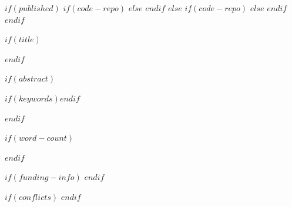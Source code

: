 

$if(published)$
$if(code-repo)$
$else$
$endif$
$else$
$if(code-repo)$
$else$
$endif$
$endif$

\vspace{0.25in}

$if(title)$
\maketitle
$endif$

\vspace{0.25in}


$if(abstract)$
\begin{abstract}
\noindent            %
$abstract$
\end{abstract}

\vspace{\baselineskip}

$if(keywords)$\noindent {}$endif$

$endif$

\vspace{0.25in}


$if(word-count)$
{
\begin{center}
\end{center}
}
$endif$

\vspace{0.25in}


$if(funding-info)$
\noindent
{}
$endif$


$if(conflicts)$
\noindent
{}
$endif$

\restoregeometry